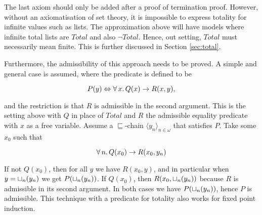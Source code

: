 The last axiom should only be added after a proof of termination
proof. However, without an axiomatisation of set theory, it is
impossible to express totality for infinite values such as lists. The
approximation above will have models where infinite total lists are
$Total$ and also $\neg Total$. Hence, out setting, $Total$ must
necessarily mean finite. This is further discussed in Section
\ref{sec:total}.

\pagebreak
Furthermore, the admissibility of this approach needs to be proved. A
simple and general case is assumed, where the predicate is defined to
be

$$P(y) \Leftrightarrow \forall \, x . \, Q(x) \rightarrow R(x,y),$$

\noindent
and the restriction is that $R$ is admissible in the second
argument. This is the setting above with $Q$ in place of $Total$ and
$R$ the admissible equality predicate with $x$ as a free
variable. Assume a $\sqsubseteq$-chain $\langle y_n
\rangle_{n\in\omega}$ that satisfies $P$. Take some $x_0$ such that

$$\forall \, n . \, Q(x_0) \rightarrow R(x_0,y_n)$$

If not $Q(x_0)$, then for all $y$ we have $R(x_0,y)$, and in
particular when $y=\sqcup_{n}(y_n)$ we get $P(\sqcup_{n}(y_n))$. If
$Q(x_0)$, then $R(x_0,\sqcup_{n}(y_n))$ because $R$ is admissible in its
second argument. In both cases we have $P(\sqcup_{n}(y_n))$, hence $P$
is admissible. This technique with a predicate for totality also works
for fixed point induction.
